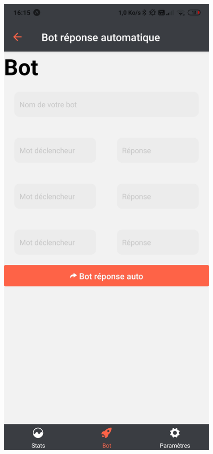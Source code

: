 \documentclass{article}
\begin{document}
\begin{figure}[h!]
\centering
\includegraphics[scale=0.1]{images/crea_bot_reponse.jpg}

\end{figure}
\end{document}
